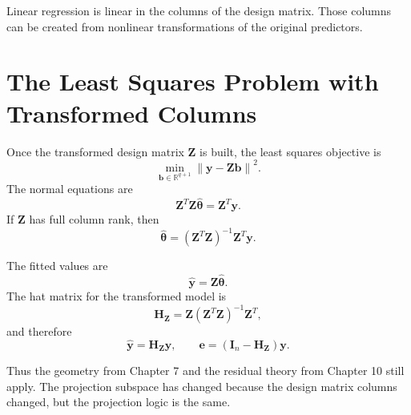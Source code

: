 Linear regression is linear in the columns of the design matrix.  Those columns can be created from nonlinear transformations of the original predictors.

\section{The Least Squares Problem with Transformed Columns}

Once the transformed design matrix \(\mathbf{Z}\) is built, the least squares objective is
\begin{equation}
  \min_{\mathbf{b}\in\mathbb{R}^{q+1}}
  \left\|\mathbf{y}-\mathbf{Z}\mathbf{b}\right\|^2.
\end{equation}
The normal equations are
\begin{equation}
  \mathbf{Z}^T\mathbf{Z}\widehat{\boldsymbol{\theta}}
  =\mathbf{Z}^T\mathbf{y}.
\end{equation}
If \(\mathbf{Z}\) has full column rank, then
\begin{equation}
  \boxed{
  \widehat{\boldsymbol{\theta}}
  = (\mathbf{Z}^T\mathbf{Z})^{-1}\mathbf{Z}^T\mathbf{y}.
  }
  \label{eq:ch11-theta-hat}
\end{equation}

The fitted values are
\begin{equation}
  \widehat{\mathbf{y}}=\mathbf{Z}\widehat{\boldsymbol{\theta}}.
\end{equation}
The hat matrix for the transformed model is
\begin{equation}
  \mathbf{H}_{\mathbf{Z}}
  =\mathbf{Z}(\mathbf{Z}^T\mathbf{Z})^{-1}\mathbf{Z}^T,
\end{equation}
and therefore
\begin{equation}
  \widehat{\mathbf{y}}=\mathbf{H}_{\mathbf{Z}}\mathbf{y},
  \qquad
  \mathbf{e}=(\mathbf{I}_n-\mathbf{H}_{\mathbf{Z}})\mathbf{y}.
\end{equation}

Thus the geometry from Chapter 7 and the residual theory from Chapter 10 still apply.  The projection subspace has changed because the design matrix columns changed, but the projection logic is the same.

